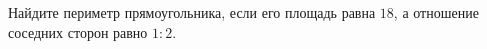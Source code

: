 \begin{ex}
	\begin{condition}
		Найдите периметр прямоугольника, если его площадь равна \( 18 \), а отношение соседних сторон равно \( 1:2 \).
	\end{condition}
\end{ex}